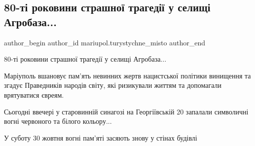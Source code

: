  
 
 
 
 

\subsection{80-ті роковини страшної трагедії у селищі Агробаза...}
\label{sec:26_10_2021.fb.mariupol.turystychne_misto.1.80_ti_rokovyny_tragedii_agrobaza}

\ifcmt
 author_begin
   author_id mariupol.turystychne_misto
 author_end
\fi

80-ті роковини страшної трагедії у селищі Агробаза...

Маріуполь вшановує пам'ять невинних жертв нацистської політики винищення та
згадує Праведників народів світу, які ризикували життям та допомагали
врятуватися євреям. 

Сьогодні ввечері у старовинній синагозі на Георгіївській 20 запалали символичні
вогні червоного та білого кольору...

У суботу 30 жовтня вогні пам'яті засяють знову у стінах будівлі
